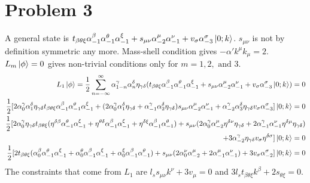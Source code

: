 \documentclass[12pt]{article}
\begin{document}
\section{Problem 3}
A general state is $t_{\beta\theta\xi}\alpha_{-1}^\beta\alpha_{-1}^\theta\alpha_{-1}^\xi+s_{\mu\nu}\alpha_{-2}^\mu\alpha_{-1}^\nu+v_\sigma\alpha_{-3}^\sigma\ket{0;k}$. $s_{\mu\nu}$ is not by definition symmetric any more. Mass-shell condition gives $-\alpha' k^\mu k_\mu=2$. $L_m\ket{\phi}=0$ gives non-trivial conditions only for $m=1,2,\text{ and }3$.
\begin{equation}
\begin{aligned}[t]
L_1\ket{\phi}=\frac{1}{2}\sum\limits_{n=-\infty}^\infty \alpha_{1-n}^\gamma\alpha_n^\delta\eta_{\gamma\delta}(t_{\beta\theta\xi}\alpha_{-1}^\beta\alpha_{-1}^\theta\alpha_{-1}^\xi+s_{\mu\nu}\alpha_{-2}^\mu\alpha_{-1}^\nu+v_\sigma\alpha_{-3}^\sigma\ket{0;k})=0\\
\frac{1}{2}[2\alpha_{0}^\gamma\alpha_1^\delta\eta_{\gamma\delta}t_{\beta\theta\xi}\alpha_{-1}^\beta\alpha_{-1}^\theta\alpha_{-1}^\xi+(2\alpha_{0}^\gamma\alpha_1^\delta\eta_{\gamma\delta}+\alpha_{-1}^\gamma\alpha_2^\delta\eta_{\gamma\delta})s_{\mu\nu}\alpha_{-2}^\mu\alpha_{-1}^\nu+\alpha_{-2}^\gamma\alpha_3^\delta\eta_{\gamma\delta}v_\sigma\alpha_{-3}^\sigma]\ket{0;k}=0\\
\frac{1}{2}[2\alpha_{0}^\gamma\eta_{\gamma\delta}t_{\beta\theta\xi}(\eta^{\delta\beta}\alpha_{-1}^\theta\alpha_{-1}^\xi+\eta^{\theta\delta}\alpha_{-1}^\beta\alpha_{-1}^\xi+\eta^{\delta\xi}\alpha_{-1}^\beta\alpha_{-1}^\theta)+s_{\mu\nu}(2\alpha_{0}^\gamma\alpha_{-2}^\mu\eta^{\delta\nu}\eta_{\gamma\delta}+2\alpha_{-1}^\gamma\alpha_{-1}^\nu\eta^{\delta\mu}\eta_{\gamma\delta})\\
+3\alpha_{-2}^\gamma\eta_{\gamma\delta}v_\sigma\eta^{\delta\sigma}]\ket{0;k}=0\\
\frac{1}{2}[2t_{\beta\theta\xi}(\alpha_{0}^\beta\alpha_{-1}^\theta\alpha_{-1}^\xi+\alpha_{0}^\theta\alpha_{-1}^\beta\alpha_{-1}^\xi+\alpha_{0}^\xi\alpha_{-1}^\beta\alpha_{-1}^\theta)+s_{\mu\nu}(2\alpha_{0}^\nu\alpha_{-2}^\mu+2\alpha_{-1}^\mu\alpha_{-1}^\nu)+3v_\sigma\alpha_{-2}^\sigma]\ket{0;k}=0
\end{aligned}
\end{equation}
The constraints that come from $L_1$ are $l_s s_{\mu\nu}k^{\nu}+3v_\mu=0$ and $3l_s t_{\beta\theta\xi}k^\beta+2s_{\theta\xi}=0$.
\end{document}
